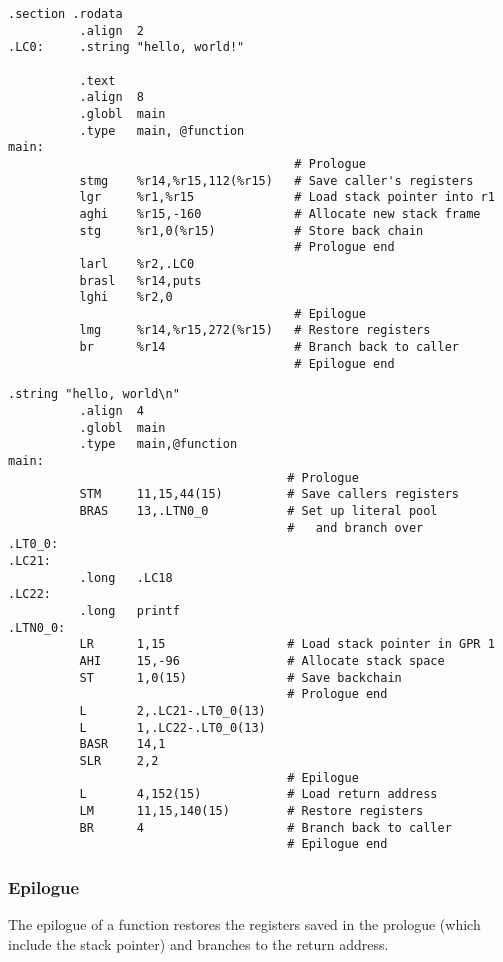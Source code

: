 \documentclass[english,11pt,twoside,toc=bib,toc=idx]{scrreprt}
\begin{document}
\ifzseries
\begin{lstlisting}[language=simpleasm,style=float,label=lst:prolcode,
  caption={[Prologue and epilogue example]{Prologue and epilogue example.
      This example stores the optional backchain.}}]
          .section .rodata
          .align  2
.LC0:     .string "hello, world!"

          .text
          .align  8
          .globl  main
          .type   main, @function
main:
                                        # Prologue
          stmg    %r14,%r15,112(%r15)   # Save caller's registers
          lgr     %r1,%r15              # Load stack pointer into r1
          aghi    %r15,-160             # Allocate new stack frame
          stg     %r1,0(%r15)           # Store back chain
                                        # Prologue end
          larl    %r2,.LC0
          brasl   %r14,puts
          lghi    %r2,0
                                        # Epilogue
          lmg     %r14,%r15,272(%r15)   # Restore registers
          br      %r14                  # Branch back to caller
                                        # Epilogue end
\end{lstlisting}
\else
\begin{lstlisting}[language=simpleasm,style=float,label=lst:prolcode,
  caption=Prologue and epilogue example]
          .string "hello, world\n"
          .align  4
          .globl  main
          .type   main,@function
main:
                                       # Prologue
          STM     11,15,44(15)         # Save callers registers
          BRAS    13,.LTN0_0           # Set up literal pool
                                       #   and branch over
.LT0_0:
.LC21:
          .long   .LC18
.LC22:
          .long   printf
.LTN0_0:
          LR      1,15                 # Load stack pointer in GPR 1
          AHI     15,-96               # Allocate stack space
          ST      1,0(15)              # Save backchain
                                       # Prologue end
          L       2,.LC21-.LT0_0(13)
          L       1,.LC22-.LT0_0(13)
          BASR    14,1
          SLR     2,2
                                       # Epilogue
          L       4,152(15)            # Load return address
          LM      11,15,140(15)        # Restore registers
          BR      4                    # Branch back to caller
                                       # Epilogue end
\end{lstlisting}
\fi

\subsubsection{Epilogue}
The epilogue of a function restores the registers saved in the prologue
(which include the stack pointer) and branches to the return address.
\end{document}
